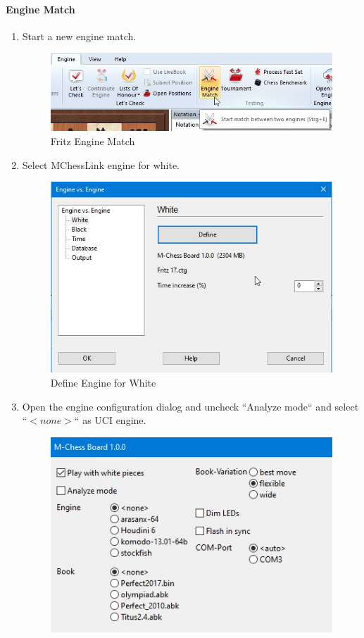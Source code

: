 \documentclass[11pt,a4paper]{article}
\begin{document}
\paragraph{Engine Match}
\begin{enumerate}
	\item Start a new engine match.
	\begin{figure}[H]
		\centering
		\includegraphics[scale=0.6]{fritz_enginematch.jpg}
		\caption{Fritz Engine Match}
		\label{fig:FritzEngineMatch}
	\end{figure}
	\item Select MChessLink engine for white.
		\begin{figure}[H]
		\centering
		\includegraphics[scale=0.7]{fritz_enginewhite.jpg}
		\caption{Define Engine for White}
		\label{fig:FritzEngineWhite}
	\end{figure}
	\item Open the engine configuration dialog and uncheck ``Analyze mode`` and select ``\begin{math}<none>\end{math}`` as UCI engine.
			\begin{figure}[H]
		\centering
		\includegraphics[scale=0.8]{fritz_engine_configure_mchesslink.jpg}

\end{figure}
\end{enumerate}
\end{document}
